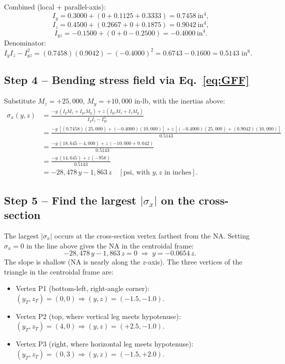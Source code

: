 \documentclass[11pt]{article}
\begin{document}
Combined (local + parallel-axis):
$$\boxed{\;I_y = 0.3000 + (0 + 0.1125 + 0.3333) = 0.7458\ \text{in}^4,}$$
$$\boxed{\;I_z = 0.4500 + (0.2667 + 0 + 0.1875) = 0.9042\ \text{in}^4,}$$
$$\boxed{\;I_{yz} = -0.1500 + (0 + 0 - 0.2500) = -0.4000\ \text{in}^4.}$$
Denominator: $I_y I_z - I_{yz}^2 = (0.7458)(0.9042) - (-0.4000)^2 = 0.6743 - 0.1600 = 0.5143$ in$^8$.

\subsection*{Step 4 -- Bending stress field via Eq.~\eqref{eq:GFF}}

Substitute $M_z = +25{,}000$, $M_y = +10{,}000$ in-lb, with the inertias above:
\begin{align*}
\sigma_x(y, z) &= \frac{-y\,(I_y M_z + I_{yz} M_y) + z\,(I_{yz} M_z + I_z M_y)}{I_y I_z - I_{yz}^2}\\
&= \frac{-y\,[(0.7458)(25{,}000) + (-0.4000)(10{,}000)] + z\,[(-0.4000)(25{,}000) + (0.9042)(10{,}000)]}{0.5143}\\
&= \frac{-y\,(18{,}645 - 4{,}000) + z\,(-10{,}000 + 9{,}042)}{0.5143}\\
&= \frac{-y\,(14{,}645) + z\,(-958)}{0.5143}\\
&= -28{,}478\,y - 1{,}863\,z\quad [\text{psi, with } y, z \text{ in inches}].
\end{align*}

\subsection*{Step 5 -- Find the largest $|\sigma_x|$ on the cross-section}

The largest $|\sigma_x|$ occurs at the cross-section vertex farthest from the NA. Setting $\sigma_x = 0$ in the line above gives the NA in the centroidal frame:
$$-28{,}478\,y - 1{,}863\,z = 0 \;\Rightarrow\; y = -0.0654\,z.$$
The slope is shallow (NA is nearly along the $z$-axis). The three vertices of the triangle in the centroidal frame are:
\begin{itemize}[leftmargin=2em, itemsep=0pt]
  \item Vertex P1 (bottom-left, right-angle corner): $(y_T, z_T) = (0, 0) \Rightarrow (y, z) = (-1.5, -1.0)$.
  \item Vertex P2 (top, where vertical leg meets hypotenuse): $(y_T, z_T) = (4, 0) \Rightarrow (y, z) = (+2.5, -1.0)$.
  \item Vertex P3 (right, where horizontal leg meets hypotenuse): $(y_T, z_T) = (0, 3) \Rightarrow (y, z) = (-1.5, +2.0)$.
\end{itemize}
\end{document}
